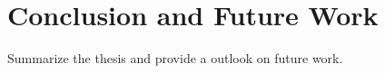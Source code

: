 \chapter{Conclusion and Future Work}
\label{ch:conclusion}

Summarize the thesis and provide a outlook on future work.
